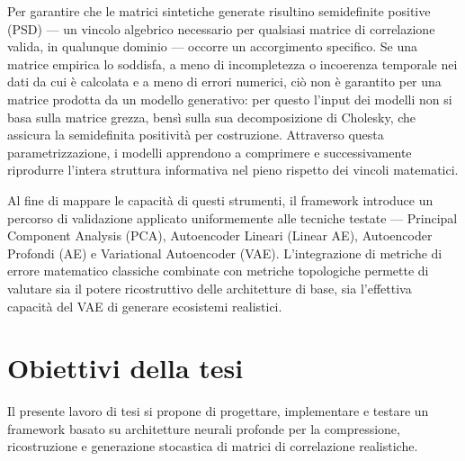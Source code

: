 Per garantire che le matrici sintetiche generate risultino semidefinite positive (PSD) --- un vincolo algebrico necessario per qualsiasi matrice di correlazione valida, in qualunque dominio --- occorre un accorgimento specifico. Se una matrice empirica lo soddisfa, a meno di incompletezza o incoerenza temporale nei dati da cui è calcolata e a meno di errori numerici, ciò non è garantito per una matrice prodotta da un modello generativo: per questo l'input dei modelli non si basa sulla matrice grezza, bensì sulla sua decomposizione di Cholesky, che assicura la semidefinita positività per costruzione. Attraverso questa parametrizzazione, i modelli apprendono a comprimere e successivamente riprodurre l'intera struttura informativa nel pieno rispetto dei vincoli matematici.

Al fine di mappare le capacità di questi strumenti, il framework introduce un percorso di validazione applicato uniformemente alle tecniche testate --- Principal Component Analysis (PCA), Autoencoder Lineari (Linear AE), Autoencoder Profondi (AE) e Variational Autoencoder (VAE). L'integrazione di metriche di errore matematico classiche combinate con metriche topologiche permette di valutare sia il potere ricostruttivo delle architetture di base, sia l'effettiva capacità del VAE di generare ecosistemi realistici.

\section{Obiettivi della tesi}

Il presente lavoro di tesi si propone di progettare, implementare e testare un framework basato su architetture neurali profonde per la compressione, ricostruzione e generazione stocastica di matrici di correlazione realistiche. 


